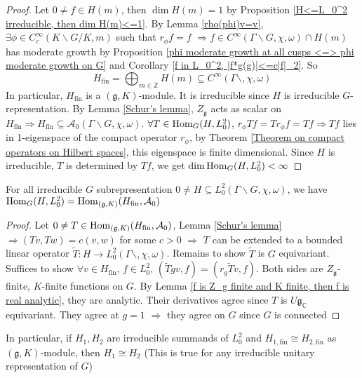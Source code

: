 \documentclass[../main.tex]{subfiles}
\begin{document}
\begin{proof}
Let $0\neq f\in H(m)$, then $\dim H(m)=1$ by Proposition \ref{H<=L_0^2 irreducible, then dim H(m)<=1}. By Lemma \ref{rho(phi)v=v}, $\exists \phi\in C_c^\infty(K\backslash G/K,m)$ such that $r_\phi f=f$ $\Rightarrow f\in C^\infty(\Gamma\backslash G,\chi,\omega)\cap H(m)$ has moderate growth by Proposition \ref{phi moderate growth at all cusps <=> phi moderate growth on G} and Corollary \ref{f in L_0^2, |f*g(g)|<=c|f|_2}. So
\[H_{\mathrm{fin}}=\bigoplus_{m\in\mathbb Z}H(m)\subseteq C^\infty(\Gamma\backslash,\chi,\omega)\]
In particular, $H_{\mathrm{fin}}$ is a $(\mathfrak g,K)$-module. It is irreducible since $H$ is irreducible $G$-representation. By Lemma \ref{Schur's lemma}, $Z_{\mathfrak g}$ acts as scalar on $H_{\mathrm{fin}}\Rightarrow H_{\mathrm{fin}}\subseteq\mathcal A_0(\Gamma\backslash G,\chi,\omega)$. $\forall T\in\operatorname{Hom}_G(H,L_0^2)$, $r_\phi Tf=Tr_\phi f=Tf\Rightarrow Tf$ lies in 1-eigenspace of the compact operator $r_\phi$, by Theorem \ref{Theorem on compact operators on Hilbert spaces}, this eigenspace is finite dimensional. Since $H$ is irreducible, $T$ is determined by $Tf$, we get $\dim\operatorname{Hom}_G(H,L_0^2)<\infty$
\end{proof}

\begin{lemma}
For all irreducible $G$ subrepresentation $0\neq H\subseteq L_0^2(\Gamma\backslash G,\chi,\omega)$, we have $\operatorname{Hom}_G(H,L_0^2)=\operatorname{Hom}_{(\mathfrak g,K)}(H_{\mathrm{fin}},\mathcal A_0)$
\end{lemma}

\begin{proof}
Let $0\neq T\in\operatorname{Hom}_{(\mathfrak g,K)}(H_{\mathrm{fin}},\mathcal A_0)$, Lemma \ref{Schur's lemma} $\Rightarrow (Tv,Tw)=c(v,w)$ for some $c>0$ $\Rightarrow$ $T$ can be extended to a bounded linear operator $\tilde T:H\to L_0^2(\Gamma\backslash,\chi,\omega)$. Remains to show $\tilde T$ is $G$ equivariant. Suffices to show $\forall v\in H_{\mathrm{fin}}$, $f\in L_0^2$, $(\tilde Tgv,f)=(r_g\tilde Tv,f)$. Both sides are $Z_{\mathfrak g}$-finite, $K$-finite functions on $G$. By Lemma \ref{f is Z_g finite and K finite, then f is real analytic}, they are analytic. Their derivatives agree since $T$ is $U\mathfrak g_{\mathbb C}$ equivariant. They agree at $g=1$ $\Rightarrow$ they agree on $G$ since $G$ is connected
\end{proof}

In particular, if $H_1,H_2$ are irreducible summands of $L_0^2$ and $H_{1,\mathrm{fin}}\cong H_{2,\mathrm{fin}}$ as $(\mathfrak g,K)$-module, then $H_1\cong H_2$ (This is true for any irreducible unitary representation of $G$)
\end{document}
